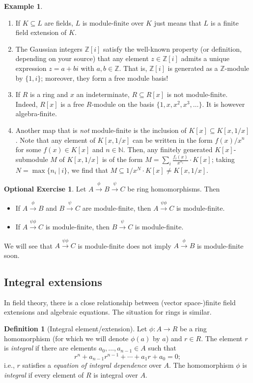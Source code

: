 \documentclass{amsart}[12pt]
\newcommand{\Z}{\mathbb{Z}}
\newcommand{\N}{\mathbb{N}}
\numberwithin{equation}{section}
\theoremstyle{plain} %
\theoremstyle{definition}
\newtheorem{definition}[equation]{Definition}
\newtheorem{ex}[equation]{Example}
\newtheorem{exer}[equation]{Optional Exercise}
\theoremstyle{remark}
\newcommand{\ssec}[1]{\subsection{#1}}
\newcommand{\xra}[1]{\xrightarrow{#1}}
\begin{document}
\begin{ex}
	\begin{enumerate}
		\item If $K\subseteq L$ are fields, $L$ is module-finite over $K$ just means that $L$ is a finite field extension of $K$.
		\item The Gaussian integers $\Z[i]$ satisfy the well-known property (or definition, depending on your source) that any element $z\in\Z[i]$ admits a unique expression $z=a+bi$ with $a,b\in \Z$. That is, $\Z[i]$ is generated as a $\Z$-module by $\{1,i\}$; moreover, they form a free module basis!
		\item If $R$ is a ring and $x$ an indeterminate, $R\subseteq R[x]$ is not module-finite. Indeed, $R[x]$ is a free $R$-module on the basis $\{1,x,x^2,x^3,\dots\}$. It is however algebra-finite.
		\item Another map that is \emph{not} module-finite is the inclusion of $K[x] \subseteq K[x,1/x]$. Note that any element of $K[x,1/x]$ can be written in the form $f(x)/x^n$ for some $f(x)\in K[x]$ and $n\in \N$. Then, any finitely generated $K[x]$-submodule $M$ of $K[x,1/x]$ is of the form $M=\sum_i \frac{f_i(x)}{x^{n_i}} \cdot K[x]$; taking $N=\max\{n_i \ | \ i\}$, we find that $M\subseteq 1/x^N \cdot K[x] \neq K[x,1/x]$.
	\end{enumerate}
\end{ex}

\begin{exer} Let $A \xra{\phi} B \xra{\psi} C$ be ring homomorphisms. Then
\begin{itemize}
\item If $A\xra{\phi} B$ and $B\xra{\psi}C$ are module-finite, then $A\xra{\psi\phi} C$ is module-finite.
\item If $A\xra{\psi\phi} C$ is module-finite, then $B \xra{\psi} C$  is module-finite.
\end{itemize}
\end{exer}

We will see that $A\xra{\psi\phi} C$ is module-finite does not imply $A\xra{\phi} B$ is module-finite soon.

\ssec{Integral extensions}

In field theory, there is a close relationship between (vector space-)finite field extensions and algebraic equations. The situation for rings is similar.

\begin{definition}[Integral element/extension] Let $\phi: A \to R$ be a ring homomorphism (for which we will denote $\phi(a)$ by $a$) and $r\in R$. 
The element $r$ is \emph{integral} if there are elements $a_0,\dots,a_{n-1}\in A$ such that
	\[ r^n + a_{n-1} r^{n-1} + \cdots + a_1 r + a_0 = 0;\]
	i.e., $r$ satisfies a \emph{equation of integral dependence} over $A$. The homomorphism $\phi$ is \emph{integral} if every element of $R$ is integral over $A$.
\end{definition}
\end{document}
